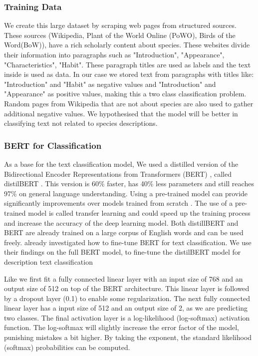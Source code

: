 \documentclass[a4paper, 12pt, oneside]{book} %
\begin{document}
\subsubsection{Training Data}
We create this large dataset by scraping web pages from structured sources.
These sources (Wikipedia, Plant of the World Online (PoWO), Birds of the Word(BoW)), have a rich scholarly content about species.
These websites divide their information into paragraphs such as "Introduction", "Appearance", "Characteristics", "Habit".
These paragraph titles are used as labels and the text inside is used as data.
In our case we stored text from paragraphs with titles like:  "Introduction" and "Habit" as negative values and "Introduction" and "Appearance" as positive values, making this a two class classification problem. 
Random pages from Wikipedia that are not about species are also used to gather additional negative values.
We hypothesised that the model will be better in classifying text not related to species descriptions.



\subsubsection{BERT for Classification}
As a base for the text classification model, We used a distilled version of the Bidirectional Encoder Representations from Transformers (BERT) \autocite{devlin_bert_2019}, called distilBERT \autocite{sanh_distilbert_2020}. 
This version is 60\% faster, has 40\% less parameters and still reaches 97\% on general language understanding.
Using a pre-trained model can provide significantly improvements over models trained from scratch \autocite{mikolov_distributed_2013}.
The use of a pre-trained model is called transfer learning and could speed up the training process and increase the accuracy of the deep learning model.
Both distillBERT and BERT are already trained on a large corpus of English words and can be used freely.
\textcite{sun_how_2020} already investigated how to fine-tune BERT for text classification.
We use their findings on the full BERT model, to fine-tune the distilBERT model for description text classification

Like \textcite{sun_how_2020} we first fit a fully connected linear layer with an input size of 768 and an output size of 512 on top of the BERT architecture. 
This linear layer is followed by a dropout layer (0.1) to enable some regularization.
The next fully connected linear layer has a input size of 512 and an output size of 2, as we are predicting two classes.
The final activation layer is a log-likelihood (log-softmax) activation function.
The log-softmax will slightly increase the error factor of the model, punishing mistakes a bit higher.
By taking the exponent, the standard likelihood (softmax) probabilities can be computed.
\end{document}
